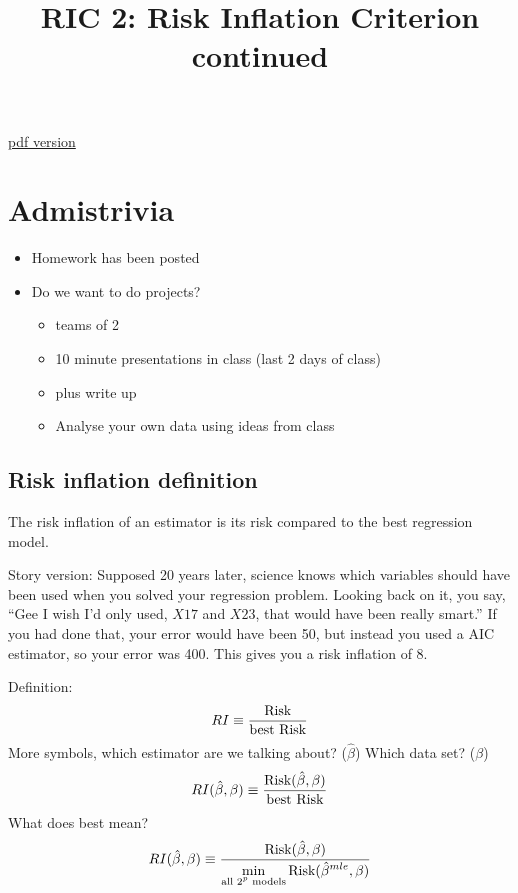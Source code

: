 \documentclass[20pt]{extarticle} %
\begin{document}
\title{RIC 2: Risk Inflation Criterion continued}
\maketitle
\href{class_RIC_2.pdf}{pdf version}
\newpage
\section{Admistrivia}
\begin{itemize}
\item Homework has been posted
\item Do we want to do projects? 
  \begin{itemize}
  \item teams of 2
  \item 10 minute presentations in class (last 2 days of class)
  \item plus write up
  \item Analyse your own data using ideas from class
  \end{itemize}
\end{itemize}
\newpage
\subsection{Risk inflation definition}

The risk inflation of an estimator is its risk compared to the best
regression model.

Story version: Supposed 20 years later, science knows which variables
should have been used when you solved your regression problem.
Looking back on it, you say, ``Gee I wish I'd only used, $X17$ and
$X23$, that would have been really smart.''  If you had done that,
your error would have been 50, but instead you used a AIC estimator,
so your error was 400.  This gives you a risk inflation of 8.

Definition:
\begin{displaymath}
RI \equiv \frac{\hbox{Risk}}{\hbox{best Risk}}
\end{displaymath}
More symbols, which estimator are we talking about?  ($\hat{\beta}$) Which data set?  ($\beta$)
\begin{displaymath}
RI(\hat{\beta},\beta) \equiv \frac{\hbox{Risk}(\hat{\beta},\beta)}{\hbox{best Risk}}
\end{displaymath}
What does best mean?
\begin{displaymath}
RI(\hat{\beta},\beta) \equiv
\frac{\hbox{Risk}(\hat{\beta},\beta)}{\displaystyle\min_{\hbox{\scriptsize all $2^p$ models}} \hbox{Risk}(\hat{\beta}^{mle},\beta)}
\end{displaymath}
\end{document}
